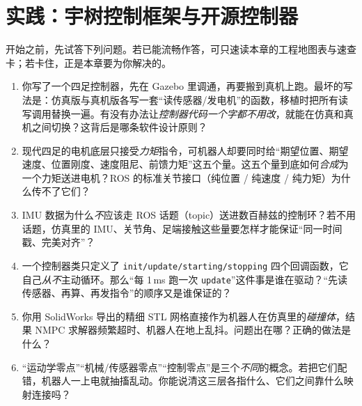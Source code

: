 \chapter{实践：宇树控制框架与开源控制器}
\label{ch:quad_prac}



\begin{practice}[前置自测]
开始之前，先试答下列问题。若已能流畅作答，可只速读本章的工程地图表与速查卡；若卡住，正是本章要为你解决的。
\begin{enumerate}
  \item 你写了一个四足控制器，先在 Gazebo 里调通，再要搬到真机上跑。最坏的写法是：仿真版与真机版各写一套“读传感器/发电机”的函数，移植时把所有读写调用替换一遍。有没有办法让\emph{控制器代码一个字都不用改}，就能在仿真和真机之间切换？这背后是哪条软件设计原则？
  \item 现代四足的电机底层只接受\emph{力矩}指令，可机器人却要同时给“期望位置、期望速度、位置刚度、速度阻尼、前馈力矩”这五个量。这五个量到底如何\emph{合成}为一个力矩送进电机？ROS 的标准关节接口（纯位置 / 纯速度 / 纯力矩）为什么传不了它们？
  \item IMU 数据为什么\emph{不}应该走 ROS 话题（topic）送进数百赫兹的控制环？若不用话题，仿真里的 IMU、关节角、足端接触这些量要怎样才能保证“同一时间戳、完美对齐”？
  \item 一个控制器类只定义了 \texttt{init/update/starting/stopping} 四个回调函数，它自己\emph{从不}主动循环。那么“每 1\,ms 跑一次 \texttt{update}”这件事是谁在驱动？“先读传感器、再算、再发指令”的顺序又是谁保证的？
  \item 你用 SolidWorks 导出的精细 STL 网格直接作为机器人在仿真里的\emph{碰撞体}，结果 NMPC 求解器频繁超时、机器人在地上乱抖。问题出在哪？正确的做法是什么？
  \item “运动学零点”“机械/传感器零点”“控制零点”是三个\emph{不同}的概念。若把它们配错，机器人一上电就抽搐乱动。你能说清这三层各指什么、它们之间靠什么映射连接吗？
\end{enumerate}
\end{practice}

